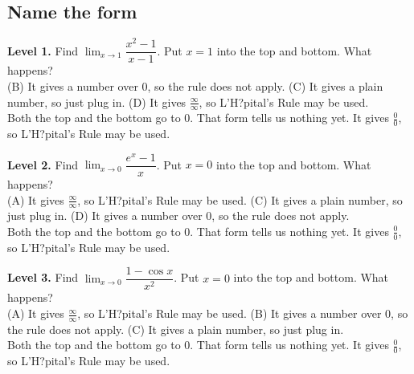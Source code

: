 \documentclass[11pt]{article}
\begin{document}
\subsection*{Name the form}
\noindent\textbf{Level 1.} Find $\displaystyle\lim_{x\to1}\dfrac{x^2-1}{x-1}$. Put $x=1$ into the top and bottom. What happens?\\  \quad (B) It gives a number over 0, so the rule does not apply. \quad (C) It gives a plain number, so just plug in. \quad (D) It gives $\frac{\infty}{\infty}$, so L'H?pital's Rule may be used.\\  \quad Both the top and the bottom go to 0. That form tells us nothing yet. It gives $\frac00$, so L'H?pital's Rule may be used.\par\medskip
\noindent\textbf{Level 2.} Find $\displaystyle\lim_{x\to0}\dfrac{e^x-1}{x}$. Put $x=0$ into the top and bottom. What happens?\\ (A) It gives $\frac{\infty}{\infty}$, so L'H?pital's Rule may be used. \quad {} \quad (C) It gives a plain number, so just plug in. \quad (D) It gives a number over 0, so the rule does not apply.\\  \quad Both the top and the bottom go to 0. That form tells us nothing yet. It gives $\frac00$, so L'H?pital's Rule may be used.\par\medskip
\noindent\textbf{Level 3.} Find $\displaystyle\lim_{x\to0}\dfrac{1-\cos x}{x^2}$. Put $x=0$ into the top and bottom. What happens?\\ (A) It gives $\frac{\infty}{\infty}$, so L'H?pital's Rule may be used. \quad (B) It gives a number over 0, so the rule does not apply. \quad (C) It gives a plain number, so just plug in. \quad {}\\  \quad Both the top and the bottom go to 0. That form tells us nothing yet. It gives $\frac00$, so L'H?pital's Rule may be used.\par\medskip
\end{document}
